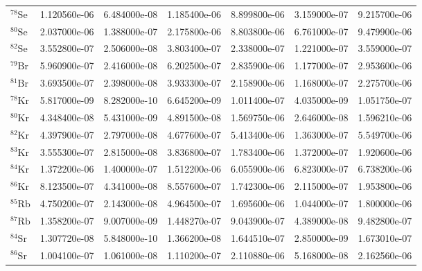 \begin{tabular}{lrrrrrr}
$^{78}\mathrm{Se}$  &       1.120560e-06 &      6.484000e-08 &      1.185400e-06 &       8.899800e-06 &      3.159000e-07 &      9.215700e-06 \\
$^{80}\mathrm{Se}$  &       2.037000e-06 &      1.388000e-07 &      2.175800e-06 &       8.803800e-06 &      6.761000e-07 &      9.479900e-06 \\
$^{82}\mathrm{Se}$  &       3.552800e-07 &      2.506000e-08 &      3.803400e-07 &       2.338000e-07 &      1.221000e-07 &      3.559000e-07 \\
$^{79}\mathrm{Br}$  &       5.960900e-07 &      2.416000e-08 &      6.202500e-07 &       2.835900e-06 &      1.177000e-07 &      2.953600e-06 \\
$^{81}\mathrm{Br}$  &       3.693500e-07 &      2.398000e-08 &      3.933300e-07 &       2.158900e-06 &      1.168000e-07 &      2.275700e-06 \\
$^{78}\mathrm{Kr}$  &       5.817000e-09 &      8.282000e-10 &      6.645200e-09 &       1.011400e-07 &      4.035000e-09 &      1.051750e-07 \\
$^{80}\mathrm{Kr}$  &       4.348400e-08 &      5.431000e-09 &      4.891500e-08 &       1.569750e-06 &      2.646000e-08 &      1.596210e-06 \\
$^{82}\mathrm{Kr}$  &       4.397900e-07 &      2.797000e-08 &      4.677600e-07 &       5.413400e-06 &      1.363000e-07 &      5.549700e-06 \\
$^{83}\mathrm{Kr}$  &       3.555300e-07 &      2.815000e-08 &      3.836800e-07 &       1.783400e-06 &      1.372000e-07 &      1.920600e-06 \\
$^{84}\mathrm{Kr}$  &       1.372200e-06 &      1.400000e-07 &      1.512200e-06 &       6.055900e-06 &      6.823000e-07 &      6.738200e-06 \\
$^{86}\mathrm{Kr}$  &       8.123500e-07 &      4.341000e-08 &      8.557600e-07 &       1.742300e-06 &      2.115000e-07 &      1.953800e-06 \\
$^{85}\mathrm{Rb}$  &       4.750200e-07 &      2.143000e-08 &      4.964500e-07 &       1.695600e-06 &      1.044000e-07 &      1.800000e-06 \\
$^{87}\mathrm{Rb}$  &       1.358200e-07 &      9.007000e-09 &      1.448270e-07 &       9.043900e-07 &      4.389000e-08 &      9.482800e-07 \\
$^{84}\mathrm{Sr}$  &       1.307720e-08 &      5.848000e-10 &      1.366200e-08 &       1.644510e-07 &      2.850000e-09 &      1.673010e-07 \\
$^{86}\mathrm{Sr}$  &       1.004100e-07 &      1.061000e-08 &      1.110200e-07 &       2.110880e-06 &      5.168000e-08 &      2.162560e-06 \\

\end{tabular}
